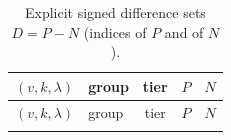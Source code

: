 \documentclass[11pt]{article}
\numberwithin{equation}{section}
\theoremstyle{definition}
\theoremstyle{remark}
\begin{document}
{\small
\setlength{\tabcolsep}{4pt}
\begin{longtable}{@{}l l c p{7.2cm} p{2.6cm}@{}}
\caption{Explicit signed difference sets $D=P-N$ (indices of $P$ and of $N$).}\label{tab:certs}\\
\toprule
$(v,k,\lambda)$ & group & tier & $P$ & $N$\\\midrule
\endfirsthead
\toprule
$(v,k,\lambda)$ & group & tier & $P$ & $N$\\\midrule
\endhead
\bottomrule
\endfoot

\end{longtable}
}
\end{document}
